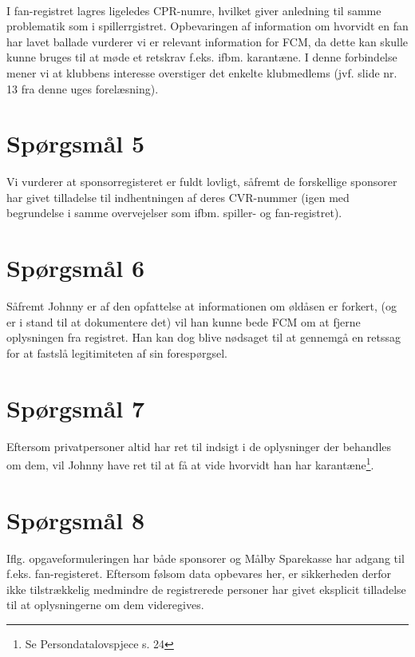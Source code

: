 \documentclass[10pt,a4paper]{article}
\begin{document}
\paragraph{}
I fan-registret lagres ligeledes CPR-numre, hvilket giver anledning
til samme problematik som i spillerrgistret. Opbevaringen af information
om hvorvidt en fan har lavet ballade vurderer vi er relevant information
for FCM, da dette kan skulle kunne bruges til at møde et retskrav
f.eks. ifbm. karantæne. I denne forbindelse mener vi at klubbens interesse
overstiger det enkelte klubmedlems (jvf. slide nr. 13 fra denne uges 
forelæsning). 

\section{Spørgsmål 5}
Vi vurderer at sponsorregisteret er fuldt lovligt, såfremt de forskellige 
sponsorer har givet tilladelse til indhentningen af deres CVR-nummer
(igen med begrundelse i samme overvejelser som ifbm. spiller- og fan-registret). 

\section{Spørgsmål 6}
Såfremt Johnny er af den opfattelse at informationen om øldåsen er forkert, 
(og er i stand til at dokumentere det) vil han kunne bede FCM om at fjerne
oplysningen fra registret. Han kan dog blive nødsaget til at gennemgå en
retssag for at fastslå legitimiteten af sin forespørgsel. 

\section{Spørgsmål 7}
Eftersom privatpersoner altid har ret til indsigt i de oplysninger der behandles 
om dem, vil Johnny have ret til at få at vide hvorvidt han har karantæne\footnote{
Se Persondatalovspjece s. 24}.

\section{Spørgsmål 8}
Iflg. opgaveformuleringen  har både sponsorer og Målby Sparekasse har adgang til 
f.eks. fan-registeret. Eftersom følsom data opbevares her, er sikkerheden derfor
ikke tilstrækkelig medmindre de registrerede personer har givet eksplicit 
tilladelse til at oplysningerne om dem videregives.
\end{document}
